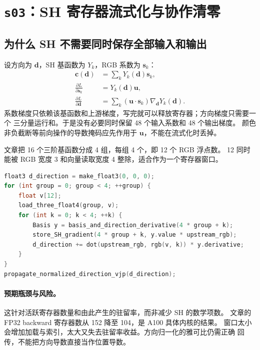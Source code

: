 \section{\texttt{s03}：SH 寄存器流式化与协作清零}

\subsection{为什么 SH 不需要同时保存全部输入和输出}

设方向为 $\boldsymbol d$，SH 基函数为 $Y_k$，RGB 系数为 $\boldsymbol s_k$：
\begin{align}
 \boldsymbol c(\boldsymbol d)&=\sum_kY_k(\boldsymbol d)\boldsymbol s_k,\\
 \frac{\partial L}{\partial\boldsymbol s_k}
 &=Y_k(\boldsymbol d)\boldsymbol u,\\
 \frac{\partial L}{\partial\boldsymbol d}
 &=\sum_k(\boldsymbol u\cdot\boldsymbol s_k)
                 \nabla_{\boldsymbol d}Y_k(\boldsymbol d).
\end{align}
系数梯度只依赖该基函数和上游梯度，写完就可以释放寄存器；方向梯度只需要一个
三分量运行和。于是没有必要同时保留 48 个输入系数和 48 个输出梯度。
颜色非负截断等前向操作的导数掩码应先作用于 $\boldsymbol u$，不能在流式化时丢掉。

文章把 16 个三阶基函数分成 4 组，每组 4 个，即 12 个 RGB 浮点数。
12 同时能被 RGB 宽度 3 和向量读取宽度 4 整除，适合作为一个寄存器窗口。

\begin{lstlisting}[language=C++,basicstyle=\ttfamily\small,breaklines=true]
float3 d_direction = make_float3(0, 0, 0);
for (int group = 0; group < 4; ++group) {
    float v[12];
    load_three_float4(group, v);
    for (int k = 0; k < 4; ++k) {
        Basis y = basis_and_direction_derivative(4 * group + k);
        store_SH_gradient(4 * group + k, y.value * upstream_rgb);
        d_direction += dot(upstream_rgb, rgb(v, k)) * y.derivative;
    }
}
propagate_normalized_direction_vjp(d_direction);
\end{lstlisting}

\paragraph{预期瓶颈与风险。}
这针对活跃寄存器数量和由此产生的驻留率，而非减少 SH 的数学项数。
文章的 FP32 backward 寄存器数从 152 降至 104，是 A100 具体内核的结果。
窗口太小会增加加载与索引，太大又失去驻留率收益。方向归一化的雅可比仍需正确
回传，不能把方向导数直接当作位置导数。

